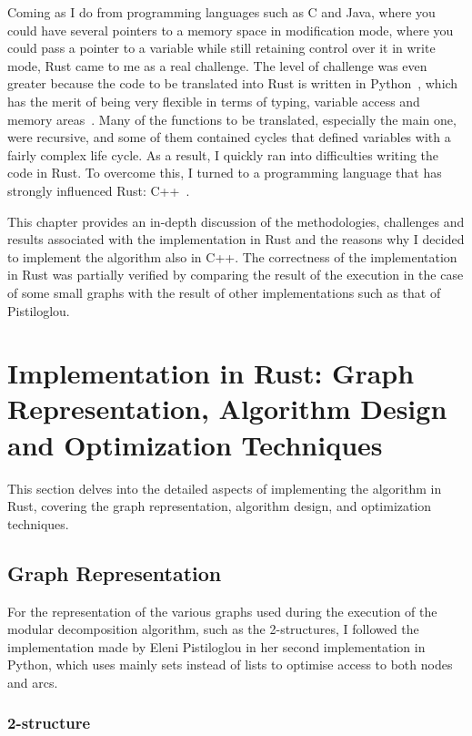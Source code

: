 Coming as I do from programming languages such as C and Java, where you could have several pointers to a memory space in modification mode, where you could pass a pointer to a variable while still retaining control over it in write mode, Rust came to me as a real challenge.
The level of challenge was even greater because the code to be translated into Rust is written in Python~\cite{pythoncode}, which has the merit of being very flexible in terms of typing, variable access and memory areas~\cite{python}.
Many of the functions to be translated, especially the main one, were recursive, and some of them contained cycles that defined variables with a fairly complex life cycle.
As a result, I quickly ran into difficulties writing the code in Rust.
To overcome this, I turned to a programming language that has strongly influenced Rust: C++~\cite{cpp}.

This chapter provides an in-depth discussion of the methodologies, challenges and results associated with the implementation in Rust and the reasons why I decided to implement the algorithm also in C++.
The correctness of the implementation in Rust was partially verified by comparing the result of the execution in the case of some small graphs with the result of other implementations such as that of Pistiloglou.

\section{Implementation in Rust: Graph Representation, Algorithm Design and Optimization Techniques}\label{sec:implementation-in-rust:-graph-representation-algorithm-design-and-optimization-techniques}

This section delves into the detailed aspects of implementing the algorithm in Rust, covering the graph representation, algorithm design, and optimization techniques.

\subsection{Graph Representation}\label{subsec:graph-representation}

For the representation of the various graphs used during the execution of the modular decomposition algorithm, such as the 2-structures, I followed the implementation made by Eleni Pistiloglou in her second implementation in Python, which uses mainly sets instead of lists to optimise access to both nodes and arcs.

\subsubsection{2-structure}

